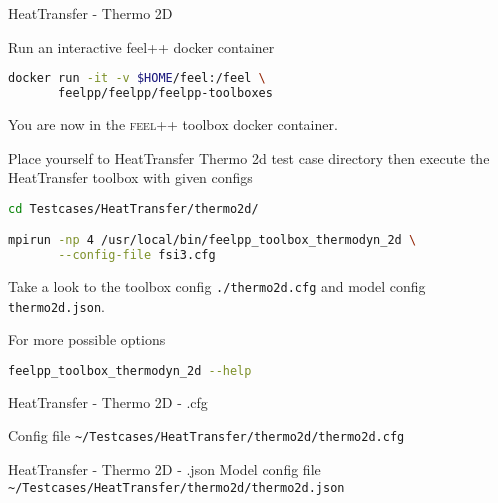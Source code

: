 \begin{frame}{HeatTransfer - Thermo 2D}

Run an interactive feel++ docker container

\begin{lstlisting}[language=Bash,mathescape=false,emph={docker}]
docker run -it -v $HOME/feel:/feel \
       feelpp/feelpp/feelpp-toolboxes 
\end{lstlisting}

You are now in the \textsc{feel++} toolbox docker container.

Place yourself to HeatTransfer Thermo 2d test case directory then execute the
HeatTransfer toolbox with given configs

\begin{lstlisting}[language=Bash,mathescape=false, emph={feelpp_toolbox_thermodyn_2d}]
cd Testcases/HeatTransfer/thermo2d/

mpirun -np 4 /usr/local/bin/feelpp_toolbox_thermodyn_2d \
       --config-file fsi3.cfg
\end{lstlisting}

Take a look to the toolbox config \lstinline{./thermo2d.cfg} and model config
\lstinline{thermo2d.json}.

For more possible options
\begin{lstlisting}[language=Bash,mathescape=false, emph={feelpp_toolbox_fsi_2d}]
feelpp_toolbox_thermodyn_2d --help
\end{lstlisting}

\end{frame}


\begin{frame}{HeatTransfer - Thermo 2D - .cfg}

Config file \lstinline{~/Testcases/HeatTransfer/thermo2d/thermo2d.cfg}

\vspace{5mm}


\end{frame}


\begin{frame}{HeatTransfer - Thermo 2D - .json}
Model config file \lstinline{~/Testcases/HeatTransfer/thermo2d/thermo2d.json}
\vspace{5mm}

\end{frame}




